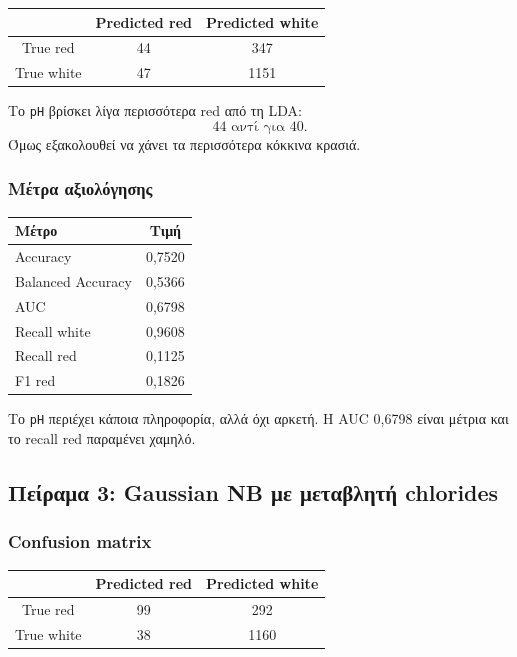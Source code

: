 \documentclass[11pt,a4paper]{article}
\newcommand{\code}[1]{\texttt{#1}}
\begin{document}
\begin{center}
\begin{tabular}{c|cc}
\toprule
 & Predicted red & Predicted white \\
\midrule
True red & 44 & 347 \\
True white & 47 & 1151 \\
\bottomrule
\end{tabular}
\end{center}

Το \code{pH} βρίσκει λίγα περισσότερα red από τη LDA:
\[
44 \text{ αντί για } 40.
\]
Όμως εξακολουθεί να χάνει τα περισσότερα κόκκινα κρασιά.

\subsubsection{Μέτρα αξιολόγησης}

\begin{center}
\begin{tabular}{lc}
\toprule
Μέτρο & Τιμή \\
\midrule
Accuracy & 0,7520 \\
Balanced Accuracy & 0,5366 \\
AUC & 0,6798 \\
Recall white & 0,9608 \\
Recall red & 0,1125 \\
F1 red & 0,1826 \\
\bottomrule
\end{tabular}
\end{center}

Το \code{pH} περιέχει κάποια πληροφορία, αλλά όχι αρκετή. Η AUC 0,6798 είναι
μέτρια και το recall red παραμένει χαμηλό.

\subsection{Πείραμα 3: Gaussian NB με μεταβλητή chlorides}

\subsubsection{Confusion matrix}

\begin{center}
\begin{tabular}{c|cc}
\toprule
 & Predicted red & Predicted white \\
\midrule
True red & 99 & 292 \\
True white & 38 & 1160 \\
\bottomrule
\end{tabular}
\end{center}
\end{document}
